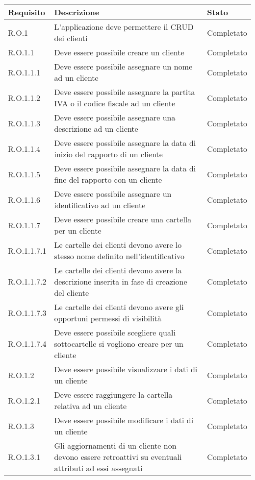 \begin{longtable}{p{} p{} p{}}
\hline\hline
\textbf{Requisito} & \textbf{Descrizione} & \textbf{Stato}\\
\hline
\hline
R.O.1    & L'applicazione deve permettere il CRUD dei clienti & Completato \\
\hline
R.O.1.1  & Deve essere possibile creare un cliente & Completato \\
\hline
R.O.1.1.1  & Deve essere possibile assegnare un nome ad un cliente & Completato \\
\hline
R.O.1.1.2  & Deve essere possibile assegnare la partita IVA o il codice fiscale ad un cliente & Completato \\
\hline
R.O.1.1.3  & Deve essere possibile assegnare una descrizione ad un cliente & Completato \\
\hline
R.O.1.1.4  & Deve essere possibile assegnare la data di inizio del rapporto di un cliente & Completato \\
\hline
R.O.1.1.5  & Deve essere possibile assegnare la data di fine del rapporto con un cliente & Completato \\
\hline
R.O.1.1.6  & Deve essere possibile assegnare un identificativo ad un cliente & Completato \\
\hline
R.O.1.1.7  & Deve essere possibile creare una cartella per un cliente & Completato \\
\hline
R.O.1.1.7.1  & Le cartelle dei clienti devono avere lo stesso nome definito nell'identificativo & Completato \\
\hline
R.O.1.1.7.2  & Le cartelle dei clienti devono avere la descrizione inserita in fase di creazione del cliente & Completato \\
\hline
R.O.1.1.7.3  & Le cartelle dei clienti devono avere gli opportuni permessi di visibilità & Completato \\
\hline
R.O.1.1.7.4  & Deve essere possibile scegliere quali sottocartelle si vogliono creare per un cliente & Completato \\
\hline
R.O.1.2  & Deve essere possibile visualizzare i dati di un cliente & Completato \\
\hline
R.O.1.2.1  & Deve essere raggiungere la cartella relativa ad un cliente & Completato \\
\hline
R.O.1.3  & Deve essere possibile modificare i dati di un cliente & Completato \\
\hline
R.O.1.3.1  & Gli aggiornamenti di un cliente non devono essere retroattivi su eventuali attributi ad essi assegnati & Completato \\

\end{longtable}
